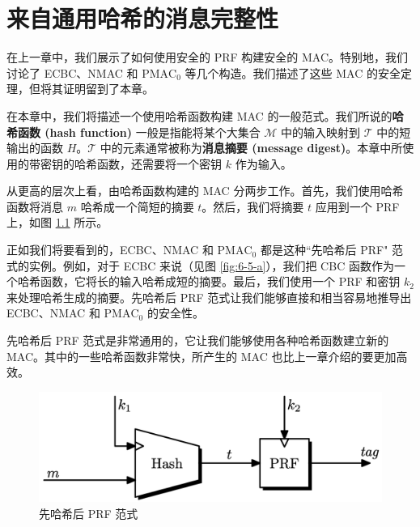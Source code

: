 \chapter{来自通用哈希的消息完整性}

在上一章中，我们展示了如何使用安全的 PRF 构建安全的 MAC。特别地，我们讨论了 ECBC、NMAC 和 $\mathrm{PMAC}_0$ 等几个构造。我们描述了这些 MAC 的安全定理，但将其证明留到了本章。

在本章中，我们将描述一个使用哈希函数构建 MAC 的一般范式。我们所说的\textbf{哈希函数 (hash function)} 一般是指能将某个大集合 $\mathcal{M}$ 中的输入映射到 $\mathcal{T}$ 中的短输出的函数 $H$。$\mathcal{T}$ 中的元素通常被称为\textbf{消息摘要 (message digest)}。本章中所使用的带密钥的哈希函数，还需要将一个密钥 $k$ 作为输入。

从更高的层次上看，由哈希函数构建的 MAC 分两步工作。首先，我们使用哈希函数将消息 $m$ 哈希成一个简短的摘要 $t$。然后，我们将摘要 $t$ 应用到一个 PRF 上，如图 \ref{fig:7-1} 所示。

正如我们将要看到的，ECBC、NMAC 和 $\mathrm{PMAC}_0$ 都是这种``先哈希后 PRF" 范式的实例。例如，对于 ECBC 来说（见图 \ref{fig:6-5-a}），我们把 CBC 函数作为一个哈希函数，它将长的输入哈希成短的摘要。最后，我们使用一个 PRF 和密钥 $k_2$ 来处理哈希生成的摘要。先哈希后 PRF 范式让我们能够直接和相当容易地推导出 ECBC、NMAC 和 $\mathrm{PMAC}_0$ 的安全性。

先哈希后 PRF 范式是非常通用的，它让我们能够使用各种哈希函数建立新的 MAC。其中的一些哈希函数非常快，所产生的 MAC 也比上一章介绍的要更加高效。

\begin{figure}
  \centering
  \includegraphics[width=0.45\linewidth]{figures/chapter7/fig1.png}
  \caption{先哈希后 PRF 范式}
  \label{fig:7-1}
\end{figure}









